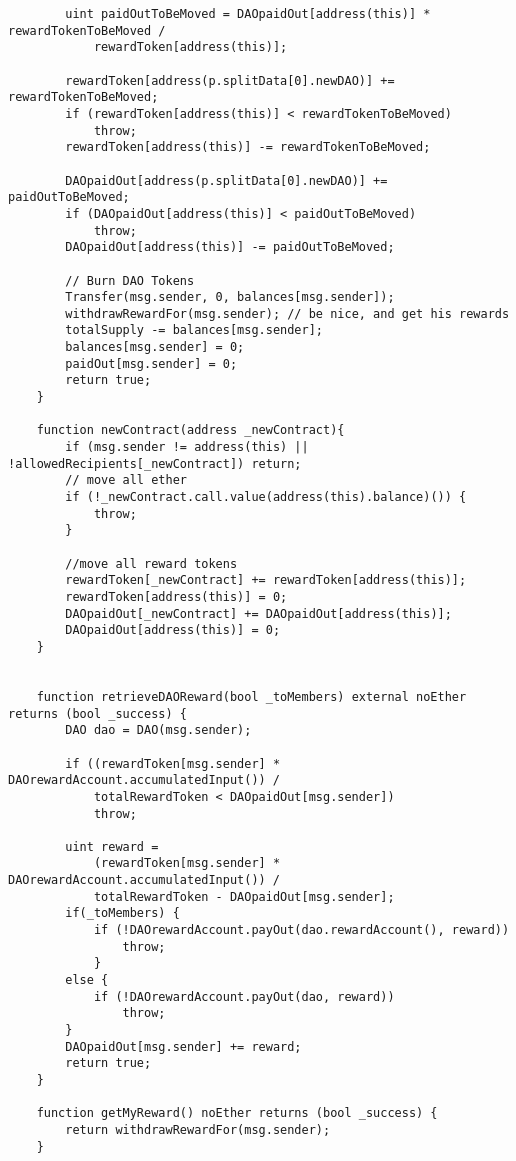 \documentclass[9pt,oneside]{amsart}
\begin{document}
\begin{appendix}
\begin{verbatim}
        uint paidOutToBeMoved = DAOpaidOut[address(this)] * rewardTokenToBeMoved /
            rewardToken[address(this)];

        rewardToken[address(p.splitData[0].newDAO)] += rewardTokenToBeMoved;
        if (rewardToken[address(this)] < rewardTokenToBeMoved)
            throw;
        rewardToken[address(this)] -= rewardTokenToBeMoved;

        DAOpaidOut[address(p.splitData[0].newDAO)] += paidOutToBeMoved;
        if (DAOpaidOut[address(this)] < paidOutToBeMoved)
            throw;
        DAOpaidOut[address(this)] -= paidOutToBeMoved;

        // Burn DAO Tokens
        Transfer(msg.sender, 0, balances[msg.sender]);
        withdrawRewardFor(msg.sender); // be nice, and get his rewards
        totalSupply -= balances[msg.sender];
        balances[msg.sender] = 0;
        paidOut[msg.sender] = 0;
        return true;
    }

    function newContract(address _newContract){
        if (msg.sender != address(this) || !allowedRecipients[_newContract]) return;
        // move all ether
        if (!_newContract.call.value(address(this).balance)()) {
            throw;
        }

        //move all reward tokens
        rewardToken[_newContract] += rewardToken[address(this)];
        rewardToken[address(this)] = 0;
        DAOpaidOut[_newContract] += DAOpaidOut[address(this)];
        DAOpaidOut[address(this)] = 0;
    }


    function retrieveDAOReward(bool _toMembers) external noEther returns (bool _success) {
        DAO dao = DAO(msg.sender);

        if ((rewardToken[msg.sender] * DAOrewardAccount.accumulatedInput()) /
            totalRewardToken < DAOpaidOut[msg.sender])
            throw;

        uint reward =
            (rewardToken[msg.sender] * DAOrewardAccount.accumulatedInput()) /
            totalRewardToken - DAOpaidOut[msg.sender];
        if(_toMembers) {
            if (!DAOrewardAccount.payOut(dao.rewardAccount(), reward))
                throw;
            }
        else {
            if (!DAOrewardAccount.payOut(dao, reward))
                throw;
        }
        DAOpaidOut[msg.sender] += reward;
        return true;
    }

    function getMyReward() noEther returns (bool _success) {
        return withdrawRewardFor(msg.sender);
    }



\end{verbatim}
\end{appendix}
\end{document}
